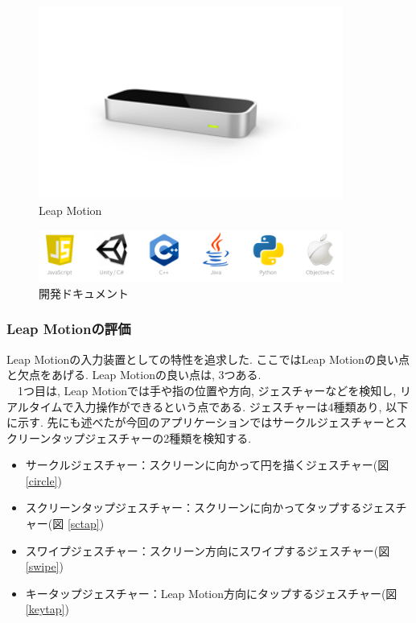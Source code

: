 \documentclass{funthesis}
\begin{document}
\begin{figure}[H]
 \begin{center}
  \includegraphics[width=100mm]{./img/LeapMotion.png}
 \end{center}
 \caption{Leap Motion}
 \label{LeapMotion}
\end{figure}

\begin{figure}[H]
 \begin{center}
  \includegraphics[width=100mm]{./img/Leapdoc.png}
 \end{center}
 \caption{開発ドキュメント}
 \label{Leapdoc}
\end{figure}



\subsubsection{Leap Motionの評価}
Leap Motionの入力装置としての特性を追求した. ここではLeap Motionの良い点と欠点をあげる. Leap Motionの良い点は, 3つある. \\ 
　1つ目は, Leap Motionでは手や指の位置や方向, ジェスチャーなどを検知し, リアルタイムで入力操作ができるという点である. ジェスチャーは4種類あり, 以下に示す. 先にも述べたが今回のアプリケーションではサークルジェスチャーとスクリーンタップジェスチャーの2種類を検知する. \\

\begin{itemize}
 \item サークルジェスチャー：スクリーンに向かって円を描くジェスチャー(図 \ref{circle})
 \item スクリーンタップジェスチャー：スクリーンに向かってタップするジェスチャー(図 \ref{sctap})
 \item スワイプジェスチャー：スクリーン方向にスワイプするジェスチャー(図 \ref{swipe})
 \item キータップジェスチャー：Leap Motion方向にタップするジェスチャー(図 \ref{keytap})
\end{itemize}
\end{document}
